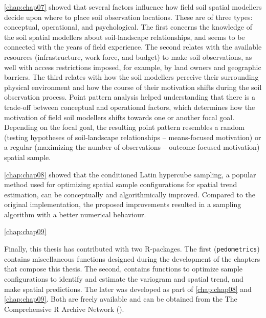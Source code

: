 \autoref{chap:chap07} showed that several factors influence how field soil spatial modellers decide upon where 
to place soil observation locations. These are of three types: conceptual, operational, and psychological. The 
first concerns the knowledge of the soil spatial modellers about soil-landscape relationships, and seems to be 
connected with the years of field experience. The second relates with the available resources (infrastructure, 
work force, and budget) to make soil observations, as well with access restrictions imposed, for example, by 
land owners and geographic barriers. The third relates with how the soil modellers perceive their surrounding 
physical environment and how the course of their motivation shifts during the soil observation process. Point 
pattern analysis helped understanding that there is a trade-off between conceptual and operational factors, 
which determines how the motivation of field soil modellers shifts towards one or another focal goal. 
Depending on the focal goal, the resulting point pattern resembles a random (testing hypotheses of 
soil-landscape relationships -- means-focused motivation) or a regular (maximizing the number of observations 
-- outcome-focused motivation) spatial sample.

\autoref{chap:chap08} showed that the conditioned Latin hypercube sampling, a popular method used for 
optimizing spatial sample configurations for spatial trend estimation, can be conceptually and algorithmically 
improved. Compared to the original implementation, the proposed improvements resulted in a sampling algorithm 
with a better numerical behaviour.

\autoref{chap:chap09} 

Finally, this thesis has contributed with two R-packages. The first (\texttt{pedometrics}) contains 
miscellaneous functions designed during the development of the chapters that compose this thesis. The second, 
contains functions to optimize sample configurations to identify and estimate the variogram and spatial trend, 
and make spatial predictions. The later was developed as part of \autoref{chap:chap08} and 
\autoref{chap:chap09}. Both are freely available and can be obtained from the The Comprehensive R Archive 
Network (\cran).
